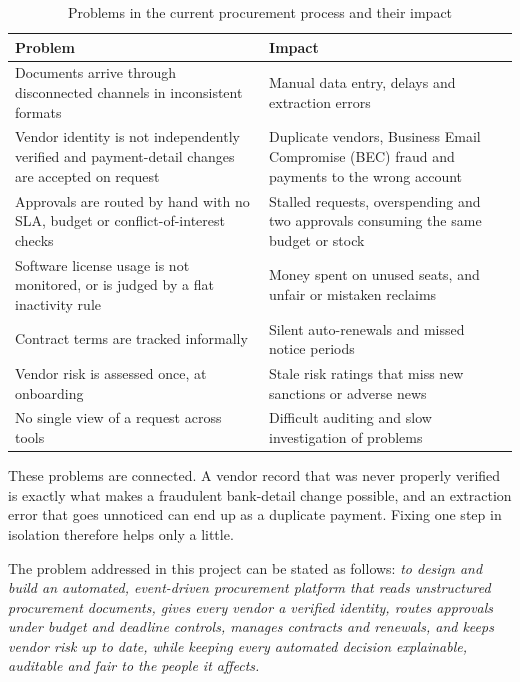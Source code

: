 \begin{table}[!htbp]
\centering
\footnotesize
\renewcommand{\arraystretch}{1.2}
\caption{Problems in the current procurement process and their impact}
\label{tab:problems}
\begin{tabular}{|p{}|p{}|}
\hline
\raggedright \textbf{Problem} & \raggedright \textbf{Impact} \tabularnewline \hline
\raggedright Documents arrive through disconnected channels in inconsistent formats & \raggedright Manual data entry, delays and extraction errors \tabularnewline \hline
\raggedright Vendor identity is not independently verified and payment-detail changes are accepted on request & \raggedright Duplicate vendors, Business Email Compromise (BEC) fraud and payments to the wrong account \tabularnewline \hline
\raggedright Approvals are routed by hand with no SLA, budget or conflict-of-interest checks & \raggedright Stalled requests, overspending and two approvals consuming the same budget or stock \tabularnewline \hline
\raggedright Software license usage is not monitored, or is judged by a flat inactivity rule & \raggedright Money spent on unused seats, and unfair or mistaken reclaims \tabularnewline \hline
\raggedright Contract terms are tracked informally & \raggedright Silent auto-renewals and missed notice periods \tabularnewline \hline
\raggedright Vendor risk is assessed once, at onboarding & \raggedright Stale risk ratings that miss new sanctions or adverse news \tabularnewline \hline
\raggedright No single view of a request across tools & \raggedright Difficult auditing and slow investigation of problems \tabularnewline \hline
\end{tabular}
\end{table}

These problems are connected. A vendor record that was never properly verified is exactly what makes a fraudulent bank-detail change possible, and an extraction error that goes unnoticed can end up as a duplicate payment. Fixing one step in isolation therefore helps only a little.

The problem addressed in this project can be stated as follows: \textit{to design and build an automated, event-driven procurement platform that reads unstructured procurement documents, gives every vendor a verified identity, routes approvals under budget and deadline controls, manages contracts and renewals, and keeps vendor risk up to date, while keeping every automated decision explainable, auditable and fair to the people it affects.}


